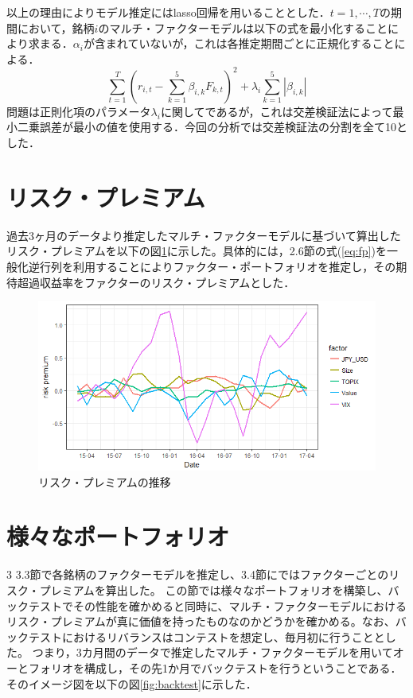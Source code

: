 \documentclass[11pt]{jreport}
\begin{document}
以上の理由によりモデル推定にはlasso回帰を用いることとした．$t=1,\cdots,T$の期間において，銘柄$i$のマルチ・ファクターモデルは以下の式を最小化することにより求まる．$\alpha_i$が含まれていないが，これは各推定期間ごとに正規化することによる．
\begin{equation}
\sum_{t=1}^T\left(r_{i,t} - \sum_{k=1}^5\beta_{i,k}F_{k,t} \right)^2 + \lambda_i\sum_{k=1}^5|\beta_{i,k}|
\end{equation}
問題は正則化項のパラメータ$\lambda_i$に関してであるが，これは交差検証法によって最小二乗誤差が最小の値を使用する．今回の分析では交差検証法の分割を全て10とした．


\section{リスク・プレミアム}
過去3ヶ月のデータより推定したマルチ・ファクターモデルに基づいて算出したリスク・プレミアムを以下の図\ref{fig:riskpremium}に示した。具体的には，2.6節の式(\ref{eq:fp})を一般化逆行列を利用することによりファクター・ポートフォリオを推定し，その期待超過収益率をファクターのリスク・プレミアムとした．

\begin{figure}[H]
	\begin{center}
		\includegraphics[width=15cm]{./fig/riskpremium.png}
		\caption{リスク・プレミアムの推移}
		\label{fig:riskpremium}
	\end{center}
\end{figure}
\section{様々なポートフォリオ}
3
3.3節で各銘柄のファクターモデルを推定し、3.4節にではファクターごとのリスク・プレミアムを算出した。
この節では様々なポートフォリオを構築し、バックテストでその性能を確かめると同時に、マルチ・ファクターモデルにおけるリスク・プレミアムが真に価値を持ったものなのかどうかを確かめる。なお、バックテストにおけるリバランスはコンテストを想定し、毎月初に行うこととした。
つまり，3カ月間のデータで推定したマルチ・ファクターモデルを用いてオーとフォリオを構成し，その先1か月でバックテストを行うということである．
そのイメージ図を以下の図\ref{fig:backtest}に示した．
\end{document}
